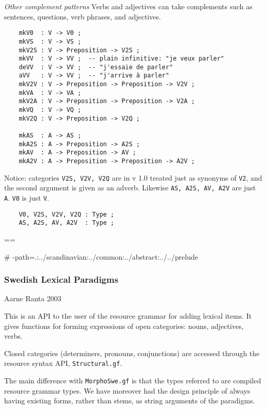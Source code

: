 \documentclass[11pt,a4paper]{article}
\newcommand{\commOut}[1]{}
\newcommand{\subsubsubsection}[1]{\textit{#1}}
\begin{document}
\subsubsubsection{Other complement patterns}
Verbs and adjectives can take complements such as sentences,
questions, verb phrases, and adjectives.

\begin{verbatim}
    mkV0  : V -> V0 ;
    mkVS  : V -> VS ;
    mkV2S : V -> Preposition -> V2S ;
    mkVV  : V -> VV ;  -- plain infinitive: "je veux parler"
    deVV  : V -> VV ;  -- "j'essaie de parler"
    aVV   : V -> VV ;  -- "j'arrive à parler"
    mkV2V : V -> Preposition -> Preposition -> V2V ;
    mkVA  : V -> VA ;
    mkV2A : V -> Preposition -> Preposition -> V2A ;
    mkVQ  : V -> VQ ;
    mkV2Q : V -> Preposition -> V2Q ;
  
    mkAS  : A -> AS ;
    mkA2S : A -> Preposition -> A2S ;
    mkAV  : A -> Preposition -> AV ;
    mkA2V : A -> Preposition -> Preposition -> A2V ;
\end{verbatim}

Notice: categories \texttt{V2S, V2V, V2Q} are in v 1.0 treated
just as synonyms of \texttt{V2}, and the second argument is given
as an adverb. Likewise \texttt{AS, A2S, AV, A2V} are just \texttt{A}.
\texttt{V0} is just \texttt{V}.

\begin{verbatim}
    V0, V2S, V2V, V2Q : Type ;
    AS, A2S, AV, A2V  : Type ;
\end{verbatim}

\commOut{Produced by 
gfdoc - a rudimentary GF document generator.
(c) Aarne Ranta (\htmladdnormallink{aarne@cs.chalmers.se}{mailto:aarne@cs.chalmers.se}) 2002 under GNU GPL.}

==

\# -path=.:../scandinavian:../common:../abstract:../../prelude


\subsubsection{Swedish Lexical Paradigms}
Aarne Ranta 2003

This is an API to the user of the resource grammar 
for adding lexical items. It gives functions for forming
expressions of open categories: nouns, adjectives, verbs.

Closed categories (determiners, pronouns, conjunctions) are
accessed through the resource syntax API, \texttt{Structural.gf}. 

The main difference with \texttt{MorphoSwe.gf} is that the types
referred to are compiled resource grammar types. We have moreover
had the design principle of always having existing forms, rather
than stems, as string arguments of the paradigms.
\end{document}
